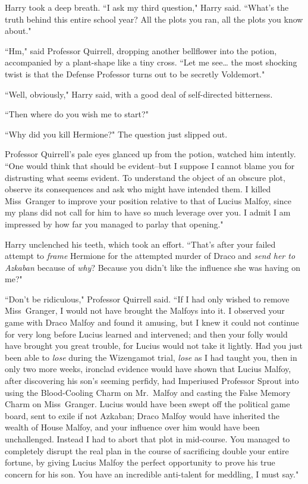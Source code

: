 Harry took a deep breath. ``I ask my third question," Harry said. ``What's the truth behind this entire school year? All the plots you ran, all the plots you know about."

``Hm," said Professor Quirrell, dropping another bellflower into the potion, accompanied by a plant-shape like a tiny cross. ``Let me see{\ldots} the most shocking twist is that the Defense Professor turns out to be secretly Voldemort."

``Well, obviously," Harry said, with a good deal of self-directed bitterness.

``Then where do you wish me to start?"

``Why did you kill Hermione?" The question just slipped out.

Professor Quirrell's pale eyes glanced up from the potion, watched him intently. ``One would think that should be evident\---but I suppose I cannot blame you for distrusting what seems evident. To understand the object of an obscure plot, observe its consequences and ask who might have intended them. I killed Miss~Granger to improve your position relative to that of Lucius Malfoy, since my plans did not call for him to have so much leverage over you. I admit I am impressed by how far you managed to parlay that opening."

Harry unclenched his teeth, which took an effort. ``That's after your failed attempt to \emph{frame} Hermione for the attempted murder of Draco and \emph{send her to Azkaban} because of \emph{why}? Because you didn't like the influence she was having on me?"

``Don't be ridiculous," Professor Quirrell said. ``If I had only wished to remove Miss~Granger, I would not have brought the Malfoys into it. I observed your game with Draco Malfoy and found it amusing, but I knew it could not continue for very long before Lucius learned and intervened; and then your folly would have brought you great trouble, for Lucius would not take it lightly. Had you just been able to \emph{lose} during the Wizengamot trial, \emph{lose} as I had taught you, then in only two more weeks, ironclad evidence would have shown that Lucius Malfoy, after discovering his son's seeming perfidy, had Imperiused Professor Sprout into using the Blood-Cooling Charm on Mr.~Malfoy and casting the False Memory Charm on Miss~Granger. Lucius would have been swept off the political game board, sent to exile if not Azkaban; Draco Malfoy would have inherited the wealth of House Malfoy, and your influence over him would have been unchallenged. Instead I had to abort that plot in mid-course. You managed to completely disrupt the real plan in the course of sacrificing double your entire fortune, by giving Lucius Malfoy the perfect opportunity to prove his true concern for his son. You have an incredible anti-talent for meddling, I must say."

